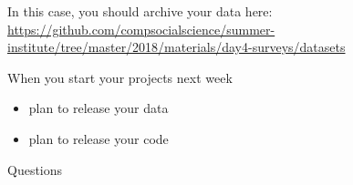 \documentclass[aspectratio=169]{beamer}
\begin{document}
\begin{frame}

In this case, you should archive your data here:\\
\url{https://github.com/compsocialscience/summer-institute/tree/master/2018/materials/day4-surveys/datasets}

\end{frame}
\begin{frame}

When you start your projects next week
\begin{itemize}
\item plan to release your data
\item plan to release your code
\end{itemize}

\end{frame}
\begin{frame}

\begin{center}
\LARGE Questions
\end{center}

\end{frame}
\end{document}

